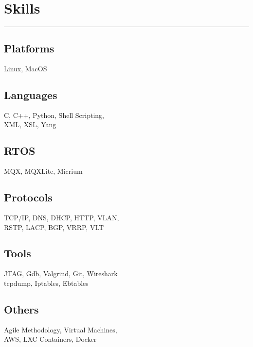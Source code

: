 \documentclass[]{mariappan-resume}
\begin{document}

\begin{minipage}[t]{0.33\textwidth} 
\begin{large}
	\\
\end{large}


\section{Skills}
\noindent\rule[3mm]{5cm}{0.4pt}
\subsection{Platforms}
Linux, MacOS
\vspace{6pt}
\subsection{Languages}
C, C++, Python, Shell Scripting,\\
XML, XSL, Yang
\vspace{6pt}
\subsection{RTOS}
MQX, MQXLite, Micrium
\vspace{6pt}
\subsection{Protocols}
TCP/IP, DNS, DHCP, HTTP, VLAN,\\
RSTP, LACP, BGP, VRRP, VLT
\vspace{6pt}
\subsection{Tools}
JTAG, Gdb, Valgrind, Git, Wireshark\\
tcpdump, Iptables, Ebtables
\vspace{6pt}
\subsection{Others}
Agile Methodology, Virtual Machines,\\
AWS, LXC Containers, Docker


\end{minipage}
\end{document}
